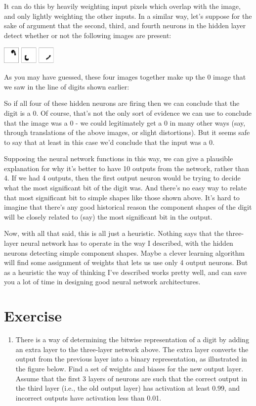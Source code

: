 It can do this by heavily weighting input pixels which overlap with the image, and only lightly weighting the other inputs. In a similar way, let's suppose for the sake of argument that the second, third, and fourth neurons in the hidden layer detect whether or not the following images are present:

{\centering
\includegraphics[width=0.2\textwidth,]{pic/mnist_other_features}
\par}

As you may have guessed, these four images together make up the 0 image that we saw in the line of digits shown earlier:

So if all four of these hidden neurons are firing then we can conclude that the digit is a 0. Of course, that's not the only sort of evidence we can use to conclude that the image was a 0 - we could legitimately get a 0 in many other ways (say, through translations of the above images, or slight distortions). But it seems safe to say that at least in this case we'd conclude that the input was a 0.

Supposing the neural network functions in this way, we can give a plausible explanation for why it's better to have 10 outputs from the network, rather than 4. If we had 4 outputs, then the first output neuron would be trying to decide what the most significant bit of the digit was. And there's no easy way to relate that most significant bit to simple shapes like those shown above. It's hard to imagine that there's any good historical reason the component shapes of the digit will be closely related to (say) the most significant bit in the output.

Now, with all that said, this is all just a heuristic. Nothing says that the three-layer neural network has to operate in the way I described, with the hidden neurons detecting simple component shapes. Maybe a clever learning algorithm will find some assignment of weights that lets us use only 4 output neurons. But as a heuristic the way of thinking I've described works pretty well, and can save you a lot of time in designing good neural network architectures.

\section{Exercise}
\begin{enumerate}
\item 
There is a way of determining the bitwise representation of a digit by adding an extra layer to the three-layer network above. The extra layer converts the output from the previous layer into a binary representation, as illustrated in the figure below. Find a set of weights and biases for the new output layer. Assume that the first 3 layers of neurons are such that the correct output in the third layer (i.e., the old output layer) has activation at least 0.99, and incorrect outputs have activation less than 0.01. 
\end{enumerate}

